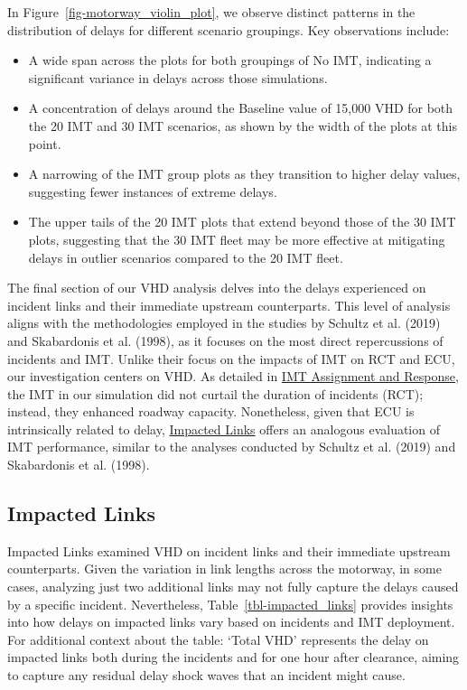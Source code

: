 \documentclass[fancy, oneside, mastersfancy, ms]{byuthesis}
\providecommand{\tightlist}{%
  \setlength{\itemsep}{0pt}\setlength{\parskip}{0pt}}\usepackage{longtable,booktabs,array}
\begin{document}
In Figure~\ref{fig-motorway_violin_plot}, we observe distinct patterns
in the distribution of delays for different scenario groupings. Key
observations include:

\begin{itemize}
\tightlist
\item
  A wide span across the plots for both groupings of No IMT, indicating
  a significant variance in delays across those simulations.
\item
  A concentration of delays around the Baseline value of 15,000 VHD for
  both the 20 IMT and 30 IMT scenarios, as shown by the width of the
  plots at this point.
\item
  A narrowing of the IMT group plots as they transition to higher delay
  values, suggesting fewer instances of extreme delays.
\item
  The upper tails of the 20 IMT plots that extend beyond those of the 30
  IMT plots, suggesting that the 30 IMT fleet may be more effective at
  mitigating delays in outlier scenarios compared to the 20 IMT fleet.
\end{itemize}

The final section of our VHD analysis delves into the delays experienced
on incident links and their immediate upstream counterparts. This level
of analysis aligns with the methodologies employed in the studies by
Schultz et al. (2019) and Skabardonis et al. (1998), as it focuses on
the most direct repercussions of incidents and IMT. Unlike their focus
on the impacts of IMT on RCT and ECU, our investigation centers on VHD.
As detailed in \protect\hyperlink{sec-imt_response}{IMT Assignment and
Response}, the IMT in our simulation did not curtail the duration of
incidents (RCT); instead, they enhanced roadway capacity. Nonetheless,
given that ECU is intrinsically related to delay,
\protect\hyperlink{sec-impacted}{Impacted Links} offers an analogous
evaluation of IMT performance, similar to the analyses conducted by
Schultz et al. (2019) and Skabardonis et al. (1998).

\hypertarget{sec-impacted}{%
\subsection{Impacted Links}\label{sec-impacted}}

Impacted Links examined VHD on incident links and their immediate
upstream counterparts. Given the variation in link lengths across the
motorway, in some cases, analyzing just two additional links may not
fully capture the delays caused by a specific incident. Nevertheless,
Table~\ref{tbl-impacted_links} provides insights into how delays on
impacted links vary based on incidents and IMT deployment. For
additional context about the table: `Total VHD' represents the delay on
impacted links both during the incidents and for one hour after
clearance, aiming to capture any residual delay shock waves that an
incident might cause.
\end{document}
